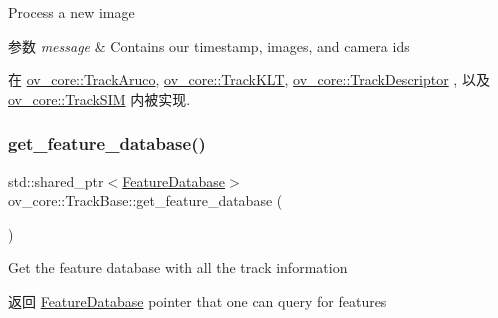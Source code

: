Process a new image 


\begin{DoxyParams}{参数}
{\em message} & Contains our timestamp, images, and camera ids \\
\hline
\end{DoxyParams}


在 \hyperlink{classov__core_1_1TrackAruco_a8c6b74f31cabe516bb9ceb2d2326a2a9}{ov\+\_\+core\+::\+Track\+Aruco}, \hyperlink{classov__core_1_1TrackKLT_a8cb9c3595fbbddc9a563137cd06b07cf}{ov\+\_\+core\+::\+Track\+K\+LT}, \hyperlink{classov__core_1_1TrackDescriptor_afcbf3078992f740582eac24e3164e6f1}{ov\+\_\+core\+::\+Track\+Descriptor} , 以及 \hyperlink{classov__core_1_1TrackSIM_a4c1537c48eec664a2c83dacc4b7e5778}{ov\+\_\+core\+::\+Track\+S\+IM} 内被实现.

\mbox{\label{classov__core_1_1TrackBase_aebcef580e2c1639d45bcb74e2bc516aa}} 
\subsubsection{\texorpdfstring{get\+\_\+feature\+\_\+database()}{get\_feature\_database()}}
{\footnotesize\ttfamily std\+::shared\+\_\+ptr$<$\hyperlink{classov__core_1_1FeatureDatabase}{Feature\+Database}$>$ ov\+\_\+core\+::\+Track\+Base\+::get\+\_\+feature\+\_\+database (\begin{DoxyParamCaption}{ }\end{DoxyParamCaption})\hspace{0.3cm}{\ttfamily [inline]}}



Get the feature database with all the track information 

\begin{DoxyReturn}{返回}
\hyperlink{classov__core_1_1FeatureDatabase}{Feature\+Database} pointer that one can query for features 
\end{DoxyReturn}
